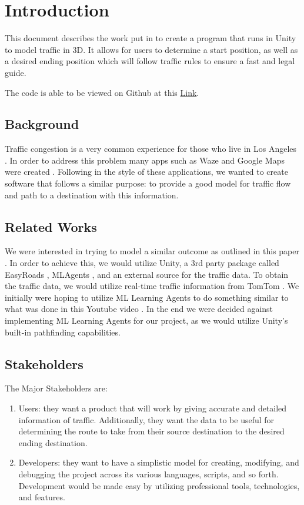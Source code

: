 \section{Introduction}

This document describes the work put in to create a program that runs in Unity to model traffic in 3D.
It allows for users to determine a start position, as well as a desired ending position which will follow traffic rules to ensure a fast and legal guide.

The code is able to be viewed on Github at this \href{https://github.com/EZRA-DVLPR/TrafficModeling}{Link}.

\subsection{Background}

Traffic congestion is a very common experience for those who live in Los Angeles \cite{CNN}.
In order to address this problem many apps such as Waze and Google Maps were created \cite{TraffApps}.
Following in the style of these applications, we wanted to create software that follows a similar purpose: to provide a good model for traffic flow and path to a destination with this information.

\subsection{Related Works}

We were interested in trying to model a similar outcome as outlined in this paper \cite{TrafficPaper}.
In order to achieve this, we would utilize Unity, a 3rd party package called EasyRoads \cite{EasyRoads}, MLAgents \cite{MLAgents}, and an external source for the traffic data.
To obtain the traffic data, we would utilize real-time traffic information from TomTom \cite{TomTom}.
We initially were hoping to utilize ML Learning Agents to do something similar to what was done in this Youtube video \cite{AITrackmania}.
In the end we were decided against implementing ML Learning Agents for our project, as we would utilize Unity's built-in pathfinding capabilities.

\subsection{Stakeholders}

The Major Stakeholders are: 
\begin{enumerate}
    \item Users: they want a product that will work by giving accurate and detailed information of traffic.
    Additionally, they want the data to be useful for determining the route to take from their source destination to the desired ending destination.
    
    \item Developers: they want to have a simplistic model for creating, modifying, and debugging the project across its various languages, scripts, and so forth.
    Development would be made easy by utilizing professional tools, technologies, and features.
\end{enumerate}

